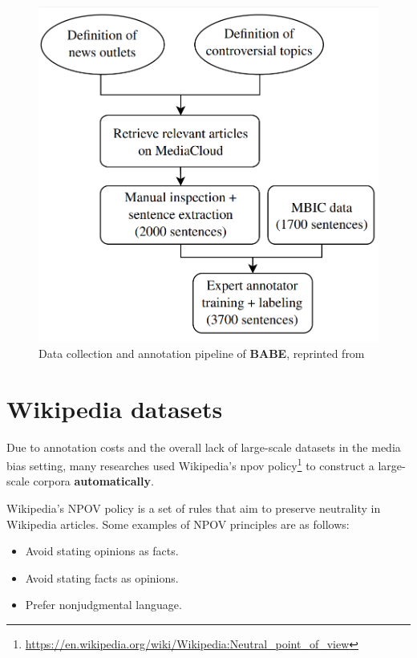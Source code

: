 \begin{figure}
  \includegraphics[scale=0.3]{my_modules/multimedia/babe_workflow.png}
  \caption{Data collection and annotation pipeline of \textbf{BABE}, reprinted from \cite{Spinde2021f}}
  \label{fig:babe-data}
\end{figure}



\section{Wikipedia datasets}\label{wiki-npov}
Due to annotation costs and the overall lack of large-scale datasets in the media bias setting, many researches \cite{pryzant2020automatically,recasens2013linguistic,hube2019neural} used Wikipedia's \Gls{npov} policy\footnote{\url{https://en.wikipedia.org/wiki/Wikipedia:Neutral_point_of_view}} to construct a large-scale corpora \textbf{automatically}. 

Wikipedia's NPOV policy is a set of rules that aim to preserve neutrality in Wikipedia articles. Some examples of NPOV principles are as follows:
\begin{itemize}
    \item Avoid stating opinions as facts.
    \item Avoid stating facts as opinions.
    \item Prefer nonjudgmental language.
\end{itemize}

